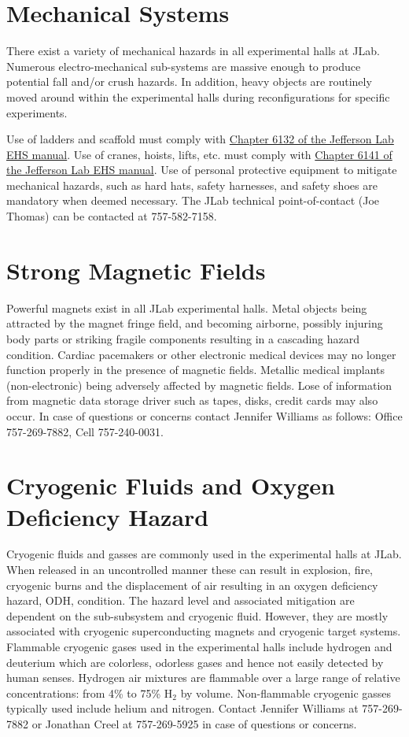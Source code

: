 \section{Mechanical Systems}

	There exist a variety of mechanical hazards in all experimental halls at JLab. 
Numerous electro-mechanical sub-systems are massive enough to produce potential fall 
and/or crush hazards.  In addition, heavy objects are routinely moved around within 
the experimental halls during reconfigurations for specific experiments. 

Use of ladders and scaffold must comply 
with \href{http://www.jlab.org/ehs/ehsmanual/manual/6132.html}{Chapter 6132 of the 
Jefferson Lab EHS manual}.
Use of cranes, hoists, lifts, etc. must comply with
\href{http://www.jlab.org/ehs/ehsmanual/manual/6141.html}{Chapter 6141 of the 
Jefferson Lab EHS manual}. 
Use of personal protective equipment 
to mitigate mechanical hazards, such as hard hats, safety harnesses, and safety 
shoes are mandatory when deemed necessary.
The JLab technical point-of-contact (Joe Thomas) can be contacted at 757-582-7158.

\section{Strong Magnetic Fields}

	Powerful magnets exist in all JLab experimental halls. Metal objects being attracted 
by the magnet fringe field, and becoming airborne, possibly injuring body parts or striking 
fragile components resulting in a cascading hazard condition. Cardiac pacemakers or other 
electronic medical devices may no longer function properly in the presence of magnetic fields. 
Metallic medical implants (non-electronic) being adversely affected by magnetic fields. Lose of 
information from magnetic data storage driver such as tapes, disks, credit cards may also occur. 
In case of questions or concerns
contact Jennifer Williams as follows: Office 757-269-7882, Cell 757-240-0031.

\section{Cryogenic Fluids and Oxygen Deficiency Hazard}

	Cryogenic fluids and gasses are commonly used in the experimental halls at JLab. 
When released in an uncontrolled manner these can result in explosion, fire, cryogenic 
burns and the displacement of air resulting in an oxygen deficiency hazard, ODH, condition. The hazard level and 
associated mitigation are dependent on the sub-subsystem and cryogenic fluid. However, 
they are mostly associated with cryogenic superconducting magnets and cryogenic target systems. 
Flammable cryogenic gases used in the experimental halls include hydrogen and deuterium which 
are colorless, odorless gases and hence not easily detected by human senses. Hydrogen air 
mixtures are flammable over a large range of relative concentrations: from 4\% to 75\% $\textrm{H}_2$ by volume. 
Non-flammable cryogenic gasses typically used include helium and nitrogen.
Contact Jennifer Williams at 757-269-7882 or Jonathan Creel at 757-269-5925 in case of questions or concerns.   

